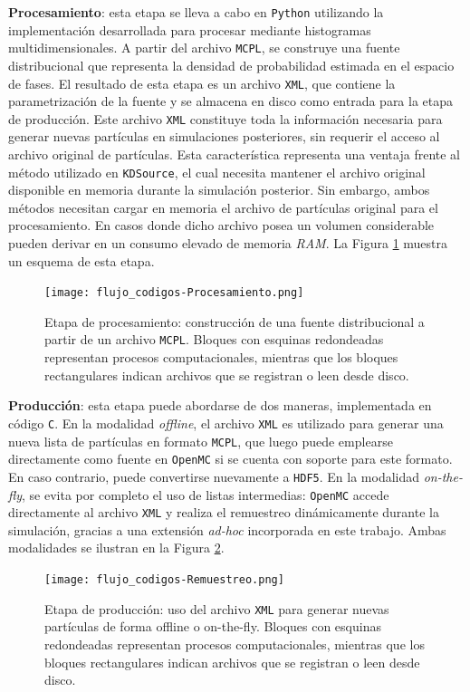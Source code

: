 \textbf{Procesamiento}: esta etapa se lleva a cabo en \texttt{Python} utilizando la implementación desarrollada para procesar mediante histogramas multidimensionales. A partir del archivo \texttt{MCPL}, se construye una fuente distribucional que representa la densidad de probabilidad estimada en el espacio de fases. El resultado de esta etapa es un archivo \texttt{XML}, que contiene la parametrización de la fuente y se almacena en disco como entrada para la etapa de producción. Este archivo \texttt{XML} constituye toda la información necesaria para generar nuevas partículas en simulaciones posteriores, sin requerir el acceso al archivo original de partículas. Esta característica representa una ventaja frente al método utilizado en \texttt{KDSource}, el cual necesita mantener el archivo original disponible en memoria durante la simulación posterior. Sin embargo, ambos métodos necesitan cargar en memoria el archivo de partículas original para el procesamiento. En casos donde dicho archivo posea un volumen considerable pueden derivar en un consumo elevado de memoria \textit{RAM}. La Figura \ref{fig:flujo_procesamiento} muestra un esquema de esta etapa.

\begin{figure}[H]
    \centering
    \texttt{[image: flujo\_codigos-Procesamiento.png]}
    \caption{Etapa de procesamiento: construcción de una fuente distribucional a partir de un archivo \texttt{MCPL}. Bloques con esquinas redondeadas representan procesos computacionales, mientras que los bloques rectangulares indican archivos que se registran o leen desde disco.}
    \label{fig:flujo_procesamiento}
\end{figure}

\textbf{Producción}: esta etapa puede abordarse de dos maneras, implementada en código \texttt{C}. En la modalidad \textit{offline}, el archivo \texttt{XML} es utilizado para generar una nueva lista de partículas en formato \texttt{MCPL}, que luego puede emplearse directamente como fuente en \texttt{OpenMC} si se cuenta con soporte para este formato. En caso contrario, puede convertirse nuevamente a \texttt{HDF5}. En la modalidad \textit{on-the-fly}, se evita por completo el uso de listas intermedias: \texttt{OpenMC} accede directamente al archivo \texttt{XML} y realiza el remuestreo dinámicamente durante la simulación, gracias a una extensión \emph{ad-hoc} incorporada en este trabajo. Ambas modalidades se ilustran en la Figura \ref{fig:flujo_produccion}.

\begin{figure}[H]
    \centering
    \texttt{[image: flujo\_codigos-Remuestreo.png]}
    \caption{Etapa de producción: uso del archivo \texttt{XML} para generar nuevas partículas de forma offline o on-the-fly. Bloques con esquinas redondeadas representan procesos computacionales, mientras que los bloques rectangulares indican archivos que se registran o leen desde disco.}
    \label{fig:flujo_produccion}
\end{figure}



